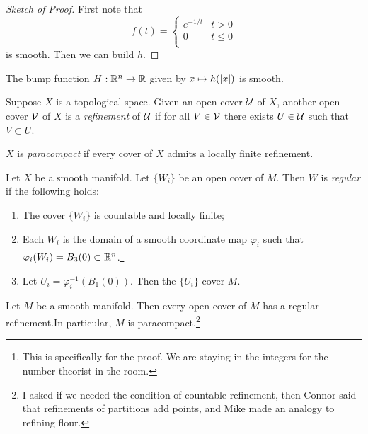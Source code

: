 \documentclass[twoside, 10pt]{article}
\begin{document}
    \begin{proof}[Sketch of Proof] First note that \[f(t) = \begin{cases}
    e^{-1/t} & t > 0 \\ 0 & t \leq 0 \\ \end{cases} \] is smooth. Then we can
build $h$.  \end{proof}

    \begin{lem} The bump function $H: \mathbb{R}^n \to \mathbb{R}$ given by $x \mapsto
    h(\lvert x\rvert)$ is smooth.  \end{lem}

    \begin{defn} Suppose $X$ is a topological space. Given an open cover
        $\mathcal{U}$ of $X$, another open cover $\mathcal{V}$ of $X$ is a
        \textit{refinement} of $\mathcal{U}$ if for all $V \in \mathcal{V}$ there exists
        $U \in \mathcal{U}$ such that $V \subset U$.  \end{defn}

    \begin{defn} $X$ is \textit{paracompact} if every cover of $X$ admits a
    locally finite refinement.  \end{defn}

    \begin{defn} Let $X$ be a smooth manifold. Let $\{W_i\}$ be an open cover
        of $M$. Then $W$ is \textit{regular} if the following holds:
        \begin{enumerate} \item The cover $\{W_i\}$ is countable and locally
            finite; \item Each $W_i$ is the domain of a smooth coordinate map
            $\varphi_i$ such that $\varphi_i(W_i) = B_3(0) \subset
            \mathbb{R}^n$.\footnote{This is specifically for the proof. We are staying
            in the integers for the number theorist in the room.} \item Let
    $U_i = \varphi_i^{-1}(B_1(0))$. Then the $\{U_i\}$ cover $M$.
    \end{enumerate} \end{defn}

    \begin{prop} Let $M$ be a smooth manifold. Then every open cover of $M$ has
        a regular refinement.In particular, $M$ is paracompact.\footnote{I
        asked if we needed the condition of countable refinement, then Connor
    said that refinements of partitions add points, and Mike made an analogy to
refining flour.} \end{prop}
\end{document}
